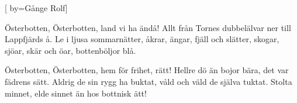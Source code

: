
[
  by={Gånge Rolf}]

\beginverse*
Österbotten, Österbotten,
land vi ha ändå!
Allt från Tornes dubbelälvar
ner till Lappfjärds å.
Le i ljusa sommarnätter,
åkrar, ängar, fjäll och slätter,
skogar, sjöar, skär och öar,
bottenböljor blå.
\endverse

\beginverse*
Österbotten, Österbotten,
hem för frihet, rätt!
Hellre dö än bojor bära,
det var fädrens sätt.
Aldrig de sin rygg ha buktat,
våld och väld de själva tuktat.
Stolta minnet, elde sinnet
än hos bottnisk ätt!
\endverse
\endsong